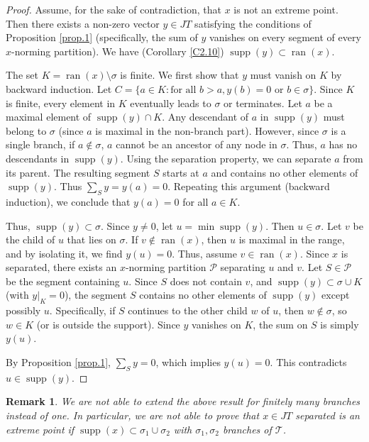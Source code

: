 \documentclass[11pt,a4paper]{amsart}
\newtheorem{remark}[theorem]{Remark}
\newcommand{\JT}{JT}
\newcommand{\Tree}{\mathcal{T}}
\newcommand{\supp}{\operatorname{supp}}
\newcommand{\ran}{\operatorname{ran}}
\begin{document}
\begin{proof}
    Assume, for the sake of contradiction, that $x$ is not an extreme point. Then there exists a non-zero vector $y \in \JT$ satisfying the conditions of Proposition \ref{prop.1} (specifically, the sum of $y$ vanishes on every segment of every $x$-norming partition). We have (Corollary \ref{C2.10})  $\supp(y) \subset \ran(x)$.
    
    The set $K = \ran(x) \setminus \sigma$ is finite. We first show that $y$ must vanish on $K$ by backward induction. 
    Let $C = \{ a \in K : \text{for all } b > a, y(b) = 0 \text{ or } b \in \sigma \}$. Since $K$ is finite, every element in $K$ eventually leads to $\sigma$ or terminates.
    Let $a$ be a maximal element of $\supp(y) \cap K$. Any descendant of $a$ in $\supp(y)$ must belong to $\sigma$ (since $a$ is maximal in the non-branch part). However, since $\sigma$ is a single branch, if $a \notin \sigma$, $a$ cannot be an ancestor of any node in $\sigma$. Thus, $a$ has no descendants in $\supp(y)$.
    Using the separation property, we can separate $a$ from its parent. The resulting segment $S$ starts at $a$ and contains no other elements of $\supp(y)$. Thus $\sum_S y = y(a) = 0$.
    Repeating this argument (backward induction), we conclude that $y(a) = 0$ for all $a \in K$.
    
    Thus, $\supp(y) \subset \sigma$. Since $y \neq 0$, let $u = \min \supp(y)$. Then $u \in \sigma$.
    Let $v$ be the child of $u$ that lies on $\sigma$. If $v \notin \ran(x)$, then $u$ is maximal in the range, and by isolating it, we find $y(u)=0$. Thus, assume $v \in \ran(x)$.
    Since $x$ is separated, there exists an $x$-norming partition $\mathcal{P}$ separating $u$ and $v$. Let $S \in \mathcal{P}$ be the segment containing $u$. Since $S$ does not contain $v$, and $\supp(y) \subset \sigma \cup K$ (with $y|_K=0$), the segment $S$ contains no other elements of $\supp(y)$ except possibly $u$.
    Specifically, if $S$ continues to the other child $w$ of $u$, then $w \notin \sigma$, so $w \in K$ (or is outside the support). Since $y$ vanishes on $K$, the sum on $S$ is simply $y(u)$.
    
    By Proposition \ref{prop.1}, $\sum_S y = 0$, which implies $y(u) = 0$. This contradicts $u \in \supp(y)$.
\end{proof}

\begin{remark}
    We are not able to extend the above result for finitely many branches instead of one. In particular, we are not able to prove that $x \in \JT$ separated is an extreme point if $\supp(x) \subset \sigma_1 \cup \sigma_2$ with $\sigma_1, \sigma_2$ branches of $\Tree$.
\end{remark}
\end{document}
